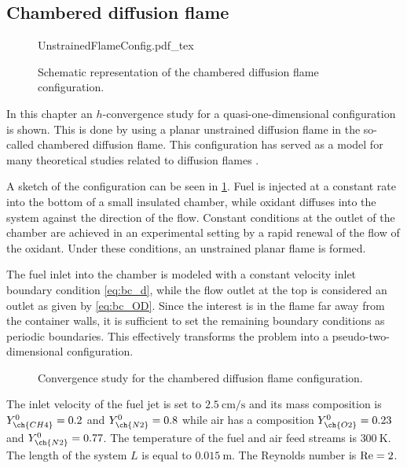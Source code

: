 \subsection{Chambered diffusion flame}\label{ss:UDF}
\begin{figure}[h]
	\begin{center}
		\def\svgwidth{0.4\textwidth}
		{UnstrainedFlameConfig.pdf_tex}
		\caption{Schematic representation of the chambered diffusion flame configuration. }
		\label{fig:chamberedDifFlame}
	\end{center}
\end{figure}
In this chapter an $h$-convergence study for a quasi-one-dimensional configuration is shown. This is done by using a planar unstrained diffusion flame in the so-called chambered diffusion flame. This configuration has served as a model for many theoretical studies related to diffusion flames \parencite{matalonDiffusionFlamesChamber1980,rameauNumericalBifurcationChambered1985,matalonEffectThermalExpansion2010}. 

A sketch of the configuration can be seen in \cref{fig:chamberedDifFlame}. Fuel is injected at a constant rate into the bottom of a small insulated chamber, while oxidant diffuses into the system against the direction of the flow. Constant conditions at the outlet of the chamber are achieved in an experimental setting by a rapid renewal of the flow of the oxidant. Under these conditions, an unstrained planar flame is formed.

The fuel inlet into the chamber is modeled with a constant velocity inlet boundary condition \cref{eq:bc_d}, while the flow outlet at the top is considered an outlet as given by \cref{eq:bc_OD}. Since the interest is in the flame far away from the container walls, it is sufficient to set the remaining boundary conditions as periodic boundaries. This effectively transforms the problem into a pseudo-two-dimensional configuration.

\begin{figure}[t!]
	\centering
	\pgfplotsset{width=0.34\textwidth, compat=1.3}
	\caption{Convergence study for the chambered diffusion flame configuration.}
	\label{ConvergenceDiffFlame}
\end{figure}
The inlet velocity of the fuel jet is set to $\SI{2.5}{\centi\meter \per \second}$ and its mass composition is $Y^0_{\ch{CH4}} = 0.2$ and $Y^0_{\ch{N2}} = 0.8$ while air has a composition $Y^0_{\ch{O2}} = 0.23$ and $Y^0_{\ch{N2}} = 0.77$. The temperature of the fuel and air feed streams is $\SI{300}{\kelvin}$. The length of the system $L$ is equal to $\SI{0.015}{\meter}$. The Reynolds number is $\text{Re} = 2$.

